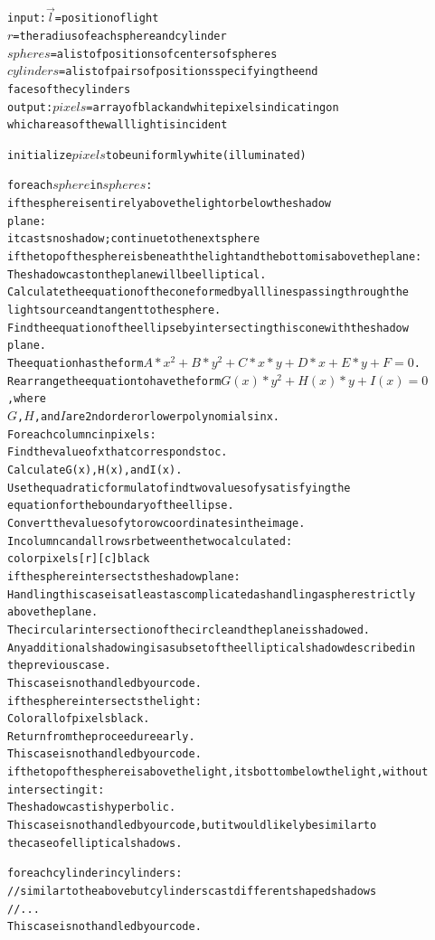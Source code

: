 \documentclass[10pt]{article}
\begin{document}
\begin{alltt}
input: \(\vec{l}\) = position of light
       \(r\) = the radius of each sphere and cylinder
       \(spheres\) = a list of positions of centers of spheres
       \(cylinders\) = a list of pairs of positions specifying the end
              faces of the cylinders
output: \(pixels\) = array of black and white pixels indicating on
              which areas of the wall light is incident

initialize \(pixels\) to be uniformly white (illuminated)

for each \(sphere\) in \(spheres\):
  if the sphere is entirely above the light or below the shadow
        plane:
    it casts no shadow; continue to the next sphere
  if the top of the sphere is beneath the light and the bottom is above the plane:
    The shadow cast on the plane will be elliptical.
    Calculate the equation of the cone formed by all lines passing through the
        light source and tangent to the sphere.
    Find the equation of the ellipse by intersecting this cone with the shadow
        plane.
    The equation has the form \(A*x^2 + B*y^2 + C*x*y + D*x + E*y + F = 0\).
    Rearrange the equation to have the form \(G(x)*y^2 + H(x)*y + I(x) = 0\), where
        \(G\), \(H\), and \(I\) are 2nd order or lower polynomials in x.
    For each column c in pixels:
      Find the value of x that corresponds to c.
      Calculate G(x), H(x), and I(x).
      Use the quadratic formula to find two values of y satisfying the
          equation for the boundary of the ellipse.
      Convert the values of y to row coordinates in the image.
      In column c and all rows r between the two calculated:
        color pixels[r][c] black
  if the sphere intersects the shadow plane:
    Handling this case is at least as complicated as handling a sphere strictly
        above the plane.
    The circular intersection of the circle and the plane is shadowed.
    Any additional shadowing is a subset of the elliptical shadow described in
        the previous case.
    This case is not handled by our code.
  if the sphere intersects the light:
    Color all of pixels black.
    Return from the proceedure early.
    This case is not handled by our code.
  if the top of the sphere is above the light, its bottom below the light, without
      intersecting it:
    The shadow cast is hyperbolic.
    This case is not handled by our code, but it would likely be similar to
        the case of elliptical shadows.

for each cylinder in cylinders:
  //similar to the above but cylinders cast different shaped shadows
  // ...
  This case is not handled by our code.
\end{alltt}
\end{document}
